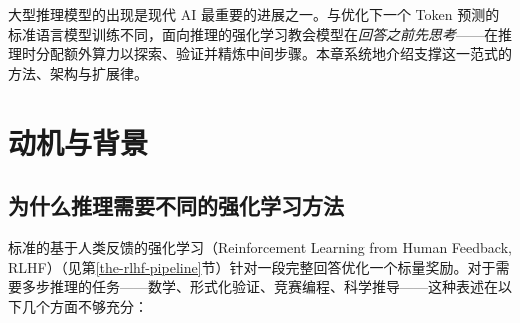 大型推理模型的出现是现代 AI 最重要的进展之一。与优化下一个 Token 预测的标准语言模型训练不同，面向推理的强化学习教会模型在\emph{回答之前先思考}——在推理时分配额外算力以探索、验证并精炼中间步骤。本章系统地介绍支撑这一范式的方法、架构与扩展律。

\section{动机与背景}
\label{subsec:reasoning_motivation}

\subsection{为什么推理需要不同的强化学习方法}
\label{why-reasoning-requires-different-rl-approaches}

标准的基于人类反馈的强化学习（Reinforcement Learning from Human Feedback, RLHF）（见第\ref{the-rlhf-pipeline}节）针对一段完整回答优化一个标量奖励。对于需要多步推理的任务——数学、形式化验证、竞赛编程、科学推导——这种表述在以下几个方面不够充分：

